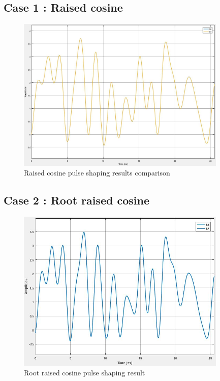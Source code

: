 \subsection*{Case 1 : Raised cosine}
\begin{figure}[h]
	\centering
	\includegraphics[width=10cm]{./algorithms/filter/figures/S6_S7.jpg}
	\caption{Raised cosine pulse shaping results comparison}
	\label{S6_S7}
\end{figure}

\subsection*{Case 2 : Root raised cosine}
\begin{figure}[h]
	\centering
	\includegraphics[width=10cm]{./algorithms/filter/figures/RRCOS_result.jpg}
	\caption{Root raised cosine pulse shaping result}
	\label{S6_S7_RRCOS}
\end{figure}

